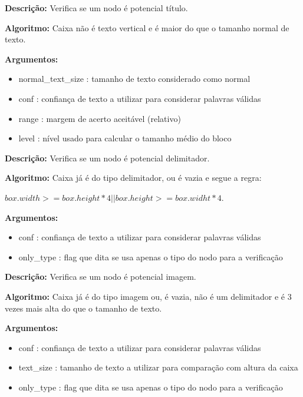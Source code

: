 	

\textbf{Descrição:} Verifica se um nodo é potencial título.
	
\textbf{Algoritmo:} Caixa não é texto vertical e é maior do que o tamanho normal de texto.


\textbf{Argumentos:}
\begin{itemize}\setlength\itemsep{-0.3em}
	\item normal\_text\_size : tamanho de texto considerado como normal
	\item conf : confiança de texto a utilizar para considerar palavras válidas
	\item range : margem de acerto aceitável (relativo)
	\item level : nível usado para calcular o tamanho médio do bloco
\end{itemize}

	

\textbf{Descrição:} Verifica se um nodo é potencial delimitador.
	
\textbf{Algoritmo:} Caixa já é do tipo delimitador, ou é vazia e segue a regra:

$ box.width >= box.height*4 || box.height >= box.widht*4 $.


\textbf{Argumentos:}
\begin{itemize}\setlength\itemsep{-0.3em}
	\item conf : confiança de texto a utilizar para considerar palavras válidas
	\item only\_type : flag que dita se usa apenas o tipo do nodo para a verificação
\end{itemize}

	

\textbf{Descrição:} Verifica se um nodo é potencial imagem.
	
\textbf{Algoritmo:} Caixa já é do tipo imagem ou, é vazia, não é um delimitador e é 3 vezes mais alta do que o tamanho de texto.


\textbf{Argumentos:}
\begin{itemize}\setlength\itemsep{-0.3em}
	\item conf : confiança de texto a utilizar para considerar palavras válidas
	\item text\_size : tamanho de texto a utilizar para comparação com altura da caixa
	\item only\_type : flag que dita se usa apenas o tipo do nodo para a verificação
\end{itemize}


